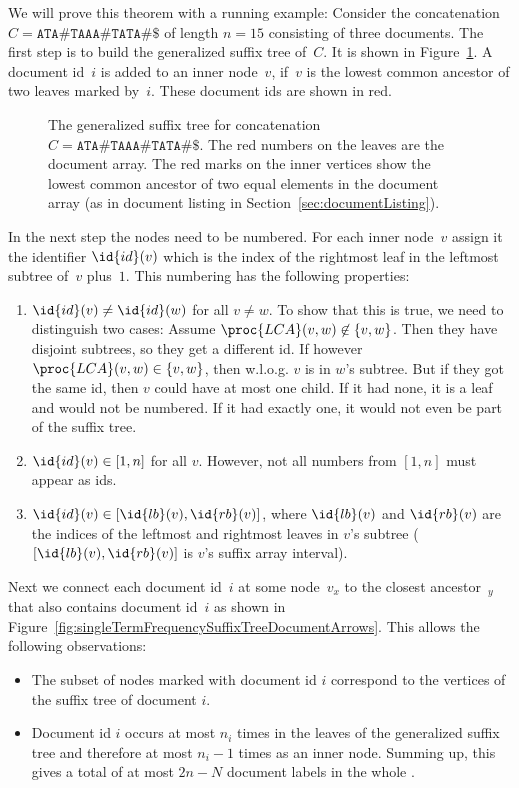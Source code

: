 \begin{Proof}
  We will prove this theorem with a running example: Consider the concatenation $C = \texttt{ATA\#TAAA\#TATA\#\$}$ of length $n=15$ consisting of three documents. The first step is to build the generalized suffix tree  of~$C$. It is shown in Figure~\ref{fig:singleTermFrequencySuffixTree}. A document id~$i$ is added to an inner node~$v$, if~$v$ is the lowest common ancestor of two leaves marked by~$i$. These document ids are shown in red.

  \begin{figure}[htb]
    \centering
    
    \caption{The generalized suffix tree for concatenation $C = \texttt{ATA\#TAAA\#TATA\#\$}$. The red numbers on the leaves are the document array. The red marks on the inner vertices show the lowest common ancestor of two equal elements in the document array (as in document listing in Section~\ref{sec:documentListing}).}
    \label{fig:singleTermFrequencySuffixTree}
  \end{figure}

  In the next step the nodes need to be numbered. For each inner node~$v$ assign it the identifier $\id{id}(v)$ which is the index of the rightmost leaf in the leftmost subtree of~$v$ plus~$1$. This numbering has the following properties:
  \begin{enumerate}
    \item $\id{id}(v) \neq \id{id}(w)$ for all $v \neq w$. To show that this is true, we need to distinguish two cases: Assume $\proc{LCA}(v,w) \not\in \{v,w\}$. Then they have disjoint subtrees, so they get a different id. If however $\proc{LCA}(v,w) \in \{v,w\}$, then w.l.o.g. $v$ is in $w$'s subtree. But if they got the same id, then $v$ could have at most one child. If it had none, it is a leaf and would not be numbered. If it had exactly one, it would not even be part of the suffix tree.
    \item $\id{id}(v) \in [1,n]$ for all $v$. However, not all numbers from $[1,n]$ must appear as ids.
    \item $\id{id}(v) \in [\id{lb}(v), \id{rb}(v)]$, where $\id{lb}(v)$ and $\id{rb}(v)$ are the indices of the leftmost and rightmost leaves in $v$'s subtree ($[\id{lb}(v),\id{rb}(v)]$ is $v$'s suffix array interval).
  \end{enumerate}

  Next we connect each document id~$i$ at some node~$v_x$ to the closest ancestor~$_y$ that also contains document id~$i$ as shown in Figure~\ref{fig:singleTermFrequencySuffixTreeDocumentArrows}. This allows the following observations:
  \begin{itemize}
    \item The subset of nodes marked with document id $i$ correspond to the vertices of the suffix tree of document $i$.
    \item Document id $i$ occurs at most $n_i$ times in the leaves of the generalized suffix tree and therefore at most $n_i - 1$ times as an inner node. Summing up, this gives a total of at most $2n - N$ document labels in the whole .
  \end{itemize}


\end{Proof}
